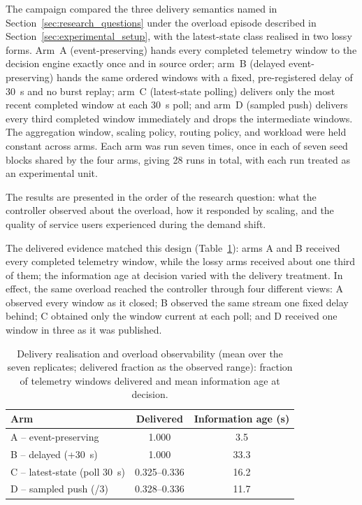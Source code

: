 The campaign compared the three delivery semantics named in
Section~\ref{sec:research_questions} under the overload episode described in
Section~\ref{sec:experimental_setup}, with the latest-state class realised in
two lossy forms. Arm~A (event-preserving) hands every completed telemetry
window to the decision engine exactly once and in source order; arm~B
(delayed event-preserving) hands the same ordered windows with a fixed,
pre-registered delay of 30~s and no burst replay; arm~C (latest-state
polling) delivers only the most recent completed window at each 30~s poll;
and arm~D (sampled push) delivers every third completed window immediately
and drops the intermediate windows. The aggregation window, scaling policy,
routing policy, and workload were held constant across arms. Each arm was run
seven times, once in each of seven seed blocks shared by the four arms,
giving 28 runs in total, with each run treated as an experimental unit.

The results are presented in the order of the research question: what the
controller observed about the overload, how it responded by scaling, and the
quality of service users experienced during the demand shift.

The delivered evidence matched this design
(Table~\ref{tab:rq1_observation}): arms A and B received every completed
telemetry window, while the lossy arms received about one third of them; the
information age at decision varied with the delivery treatment. In effect,
the same overload reached the controller through four different views: A
observed every window as it closed; B observed the same stream one fixed
delay behind; C obtained only the window current at each poll; and D
received one window in three as it was published.

\begin{table}[htbp]
    \centering
    \caption{Delivery realisation and overload observability (mean over the
    seven replicates; delivered fraction as the observed range): fraction of
    telemetry windows delivered and mean information age at decision.}
    \label{tab:rq1_observation}
    \footnotesize
    \setlength{\tabcolsep}{3pt}
    \begin{tabular}{l c c}
        \toprule
        Arm & Delivered & Information age (s) \\
        \midrule
        A -- event-preserving & 1.000 & 3.5 \\
        B -- delayed (+30~s) & 1.000 & 33.3 \\
        C -- latest-state (poll 30~s) & 0.325--0.336 & 16.2 \\
        D -- sampled push (/3) & 0.328--0.336 & 11.7 \\
        \bottomrule
    \end{tabular}
\end{table}

